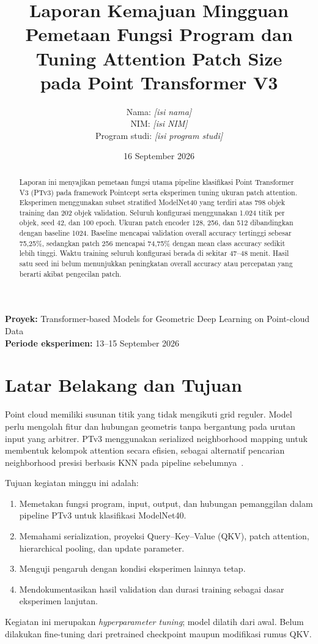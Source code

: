 \documentclass[11pt,a4paper]{article}
\title{Laporan Kemajuan Mingguan\\
 Pemetaan Fungsi Program dan Tuning Attention Patch Size\\
 pada Point Transformer V3}
\author{Nama: \textit{[isi nama]}\\
 NIM: \textit{[isi NIM]}\\
 Program studi: \textit{[isi program studi]}}
\date{16 September 2026}
\newcommand{\kode}[1]{\texttt{\detokenize{#1}}}
\begin{document}
\maketitle
\begin{center}
\textbf{Proyek:} Transformer-based Models for Geometric Deep Learning
on Point-cloud Data\\
\textbf{Periode eksperimen:} 13--15 September 2026
\end{center}

\begin{abstract}
Laporan ini menyajikan pemetaan fungsi utama pipeline klasifikasi
Point Transformer V3 (PTv3) pada framework Pointcept serta eksperimen
tuning ukuran patch attention. Eksperimen menggunakan subset stratified
ModelNet40 yang terdiri atas 798 objek training dan 202 objek validation.
Seluruh konfigurasi menggunakan 1.024 titik per objek, seed 42, dan
100 epoch. Ukuran patch encoder 128, 256, dan 512 dibandingkan dengan
baseline 1024. Baseline mencapai validation overall accuracy tertinggi
sebesar 75,25\%, sedangkan patch 256 mencapai 74,75\% dengan mean class
accuracy sedikit lebih tinggi. Waktu training seluruh konfigurasi berada
di sekitar 47--48 menit. Hasil satu seed ini belum menunjukkan peningkatan
overall accuracy atau percepatan yang berarti akibat pengecilan patch.
\end{abstract}
\tableofcontents
\newpage

\section{Latar Belakang dan Tujuan}
Point cloud memiliki susunan titik yang tidak mengikuti grid reguler.
Model perlu mengolah fitur dan hubungan geometris tanpa bergantung pada
urutan input yang arbitrer. PTv3 menggunakan serialized neighborhood
mapping untuk membentuk kelompok attention secara efisien, sebagai
alternatif pencarian neighborhood presisi berbasis KNN pada pipeline
sebelumnya~\cite{ptv3}.

Tujuan kegiatan minggu ini adalah:
\begin{enumerate}
\item Memetakan fungsi program, input, output, dan hubungan pemanggilan
      dalam pipeline PTv3 untuk klasifikasi ModelNet40.
\item Memahami serialization, proyeksi Query--Key--Value (QKV), patch
      attention, hierarchical pooling, dan update parameter.
\item Menguji pengaruh \kode{enc_patch_size} dengan kondisi eksperimen
      lainnya tetap.
\item Mendokumentasikan hasil validation dan durasi training sebagai
      dasar eksperimen lanjutan.
\end{enumerate}
Kegiatan ini merupakan \textit{hyperparameter tuning}; model dilatih
dari awal. Belum dilakukan fine-tuning dari pretrained checkpoint maupun
modifikasi rumus QKV.
\end{document}
